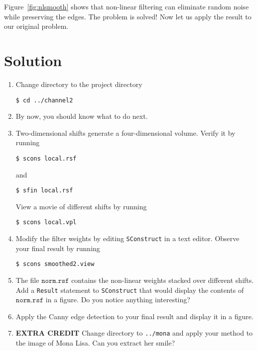 

Figure~\ref{fig:nlsmooth} shows that non-linear filtering can eliminate random noise while preserving the edges. The problem is solved! Now let us apply the result to our original problem.
 

\lstset{language=c,numbers=left,numberstyle=\tiny,showstringspaces=false}


\section{Solution}

\begin{enumerate}
\item Change directory to the project directory
\begin{verbatim}
$ cd ../channel2
\end{verbatim}
\item By now, you should know what to do next.
\item Two-dimensional shifts generate a four-dimensional volume. Verify it by running
\begin{verbatim}
$ scons local.rsf
\end{verbatim}
and
\begin{verbatim}
$ sfin local.rsf
\end{verbatim}
View a movie of different shifts by running 
\begin{verbatim}
$ scons local.vpl
\end{verbatim}
\item Modify the filter weights by editing \texttt{SConstruct} in a text editor.
Observe your final result by running
\begin{verbatim}
$ scons smoothed2.view
\end{verbatim}
\item The file $\texttt{norm.rsf}$ contains the non-linear weights stacked over different shifts. Add a \texttt{Result} statement to  \texttt{SConstruct} that would display
the contents of $\texttt{norm.rsf}$ in a figure. Do you notice anything interesting?

\answer{
}

\item Apply the Canny edge detection to your final result and display it in a figure.
\item \textbf{EXTRA CREDIT} Change directory to \verb#../mona# and apply your method to the image of Mona Lisa. Can you extract her smile?
\end{enumerate}

